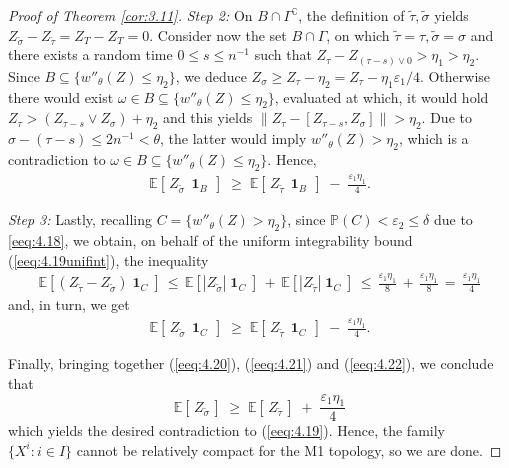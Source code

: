 \documentclass[11pt]{article}
\theoremstyle{definition}\newtheorem{example}[theorem]{Example}
\theoremstyle{definition}\newtheorem{counterexample}[theorem]{Counterexample}
\theoremstyle{definition}\newtheorem{remark}[theorem]{Remark}
\theoremstyle{definition}\newtheorem{defi}[theorem]{Definition}
\numberwithin{equation}{section}
\newcommand{\E}{\mathbb{E}}											%
\newcommand{\Pro}{\mathbb{P}}										%
\newcommand{\ind}{\operatorname{\mathbf{1}}}							%
\renewcommand{\|}{\; : \, \;}											%
\begin{document}
\begin{proof}[Proof of Theorem \ref{cor:3.11}]
		\emph{Step 2:} On $B\cap \Gamma^\complement$, the definition of $\tilde\tau, \tilde \sigma$ yields $Z_{\tilde \sigma}-Z_{\tilde \tau}=Z_T-Z_T=0$. Consider now the set $B\cap \Gamma$, on which $\tilde\tau=\tau, \tilde\sigma=\sigma$ and there exists a random time $0 \le s \le n^{-1}$ such that $Z_{\tau}-Z_{(\tau-s)\vee 0} >\eta_1>\eta_2$. Since $B\subseteq\{w''_\theta(Z)\le \eta_2\}$, we deduce  $Z_\sigma\ge Z_\tau- \eta_2 = Z_\tau - \eta_1\varepsilon_1/4$. Otherwise there would exist $\omega \in B\subseteq\{w''_\theta(Z)\le \eta_2\}$, evaluated at which, it would hold $Z_{\tau} > (Z_{\tau-s} \vee Z_{\sigma})+\eta_2$ and this yields $\lVert Z_\tau - [Z_{\tau-s}, Z_\sigma] \rVert> \eta_2$. Due to $\sigma-(\tau-s)\le 2n^{-1}< \theta$, the latter would imply $w''_\theta(Z)>\eta_2$, which is a contradiction to $\omega \in B \subseteq\{w''_\theta(Z)\le \eta_2\}$. Hence,
		\begin{align} \E \left[ \, Z_{\tilde \sigma} \, \ind_B \, \right] \; \ge \; \E \left[ \, Z_{\tilde \tau} \, \ind_B\, \right] \; - \; \frac{\varepsilon_1\eta_1}{4}.\label{eeq:4.21}\end{align}
		
	\emph{Step 3:} Lastly, recalling $C=\{w''_{\theta}(Z) >  \eta_2 \}$, since $\Pro(C)< \varepsilon_2 \le \delta$ due to \eqref{eeq:4.18}, we obtain, on behalf of the uniform integrability bound (\ref{eeq:4.19unifint}), the inequality
		\begin{align*}
			\E \left[  (Z_{\tilde \tau}-Z_{\tilde\sigma} )  \ind_C  \right] \, \le \, \E \left[  |Z_{\tilde \sigma}| \ind_C  \right] \, + \, \E \left[ |Z_{\tilde \tau}|  \ind_C  \right] 
			\, \le \, \frac{\varepsilon_1\eta_1}{8} \, + \, \frac{\varepsilon_1\eta_1}{8} \, = \, \frac{\varepsilon_1 \eta_1}{4}
		\end{align*}
		and, in turn, we get
		\begin{align} \E \left[ \, Z_{\tilde \sigma} \, \ind_C \, \right] \; \ge \; \E \left[ \, Z_{\tilde \tau} \, \ind_C \, \right] \; - \; \frac{\varepsilon_1\eta_1}{4}.\label{eeq:4.22}\end{align}
		
	Finally, bringing together (\ref{eeq:4.20}), (\ref{eeq:4.21}) and (\ref{eeq:4.22}), we conclude that
	\[ \E \left[ \, Z_{\tilde{\sigma}} \, \right] \;\ge  \; \E \left[ \, Z_{\tilde\tau} \, \right] \; + \; \frac{\varepsilon_1\eta_1}{4} \]
	which yields the desired contradiction to (\ref{eeq:4.19}). Hence, the family $\{X^i : i \in I\}$ cannot be relatively compact for the M1 topology, so we are done.
\end{proof}
\end{document}
